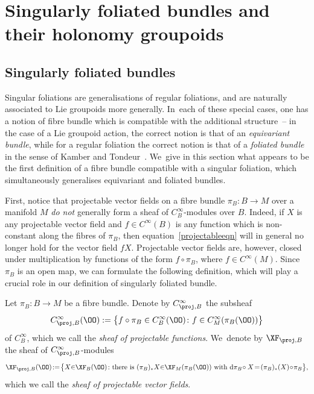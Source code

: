\section{Singularly foliated bundles and their holonomy groupoids}\label{sec4}

\subsection{Singularly foliated bundles}

Singular foliations are generalisations of regular foliations, and are naturally associated to Lie groupoids more generally. In~each of these special cases, one has a notion of fibre bundle which is compatible with the additional structure~-- in the case of a Lie groupoid action, the correct notion is that of an \textit{equivariant bundle}, while for a regular foliation the correct notion is that of a \textit{foliated bundle} in the sense of Kamber and Tondeur~\cite{folbund}. We~give in this section what appears to be the first definition of a fibre bundle compatible with a singular foliation, which simultaneously generalises equivariant and foliated bundles.

First, notice that projectable vector fields on a fibre bundle $\pi_{B}\colon B\rightarrow M$ over a manifold $M$ \textit{do not} generally form a sheaf of $C^{\infty}_{B}$-modules over $B$. Indeed, if $X$ is any projectable vector field and $f\in C^{\infty}(B)$ is any function which is non-constant along the fibres of $\pi_{B}$, then equation~\eqref{projectableeqn} will in general no longer hold for the vector field $fX$. Projectable vector fields are, however, closed under multiplication by functions of the form $f\circ\pi_{B}$, where $f\in C^{\infty}(M)$. Since $\pi_{B}$ is an open map, we can formulate the following definition, which will play a crucial role in our definition of singularly foliated bundle.

\begin{Definition}%
Let $\pi_{B}\colon B\rightarrow M$ be a fibre bundle. Denote by $C^{\infty}_{\proj,B}$ the subsheaf
\begin{gather*}
C^{\infty}_{\proj,B}(\OO):=\big\{f\circ\pi_{B}\in C^{\infty}_{B}(\OO)\colon f\in C^{\infty}_{M}(\pi_{B}(\OO))\big\}
\end{gather*}
of $C^{\infty}_{B}$, which we call the \textit{sheaf of projectable functions}. We~denote by $\XF_{\proj,B}$ the sheaf of $C^{\infty}_{\proj,B}$-modules
\begin{gather*}
\XF_{\proj,B}(\OO)\!:=\!\big\{X{\in}\XF_{B}(\OO)\colon \text{there is $(\pi_{B})_{*}X{\in}\XF_{M}(\pi_{B}(\OO))$ with ${\rm d}\pi_{B}\!\circ X\! = \! (\pi_{B})_{*}(X)\!\circ\!\pi_{B}$}\big\},
\end{gather*}
which we call the \textit{sheaf of projectable vector fields}.
\end{Definition}

